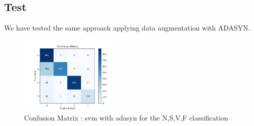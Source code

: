 \documentclass[LaM,binding=0.6cm]{sapthesis}
\begin{document}
\subsection{Test}
We have tested the same approach applying data augmentation with ADASYN.
\begin{figure}[H]
	\includegraphics[width=50mm,scale=0.7]{confusion-matrix-linear-not-linear-adasyn-smaller-test.png}
	\caption{Confusion Matrix : svm with adasyn for the N,S,V,F classification}
	\label{fig:svc3}
\end{figure}
\end{document}
